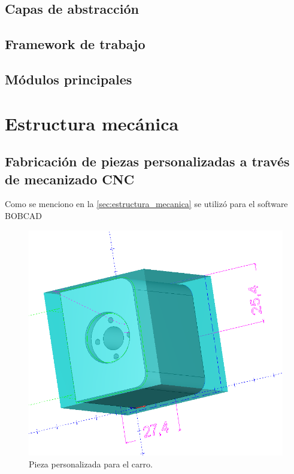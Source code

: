 \subsection{Capas de abstracción}
\subsection{Framework de trabajo}
\subsection{Módulos principales}




\section{Estructura mecánica}
\subsection{Fabricación de piezas personalizadas a través de mecanizado CNC}

Como se menciono en la \ref{sec:estructura_mecanica} se utilizó para el software BOBCAD 

\begin{figure}[ht]
	\centering
	\includegraphics[width=.5\textwidth]{./Figures/3d_carro.png}
	\caption{Pieza personalizada para el carro.}
	\label{fig:carro}
\end{figure}

